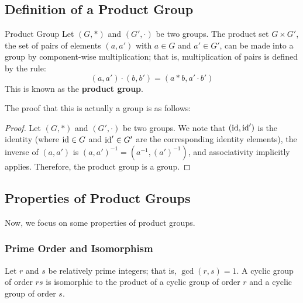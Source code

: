 \documentclass[letterpaper]{article}
\begin{document}
\subsection{Definition of a Product Group}
\begin{definition}{Product Group}{}
    Let $(G, *)$ and $(G', \cdot)$ be two groups. The product set $G \times G'$, the set of pairs of elements $(a, a')$ with $a \in G$ and $a' \in G'$, can be made into a group by component-wise multiplication; that is, multiplication of pairs is defined by the rule: 
    \[(a, a') \cdot (b, b') = (a * b, a' \cdot b')\]
    This is known as the \textbf{product group}.
\end{definition}
The proof that this is actually a group is as follows:
\begin{mdframed}
    \begin{proof}
        Let $(G, *)$ and $(G', \cdot)$ be two groups. We note that $(\operatorname{id}, \operatorname{id}')$ is the identity (where $\operatorname{id} \in G$ and $\operatorname{id}' \in G'$ are the corresponding identity elements), the inverse of $(a, a')$ is $(a, a')^{-1} = (a^{-1}, (a')^{-1})$, and associativity implicitly applies. Therefore, the product group is a group. 
    \end{proof}
\end{mdframed}

\subsection{Properties of Product Groups}
Now, we focus on some properties of product groups. 

\subsubsection{Prime Order and Isomorphism}
\begin{mdframed}
    \begin{proposition}
        Let $r$ and $s$ be relatively prime integers; that is, $\gcd(r, s) = 1$. A cyclic group of order $rs$ is isomorphic to the product of a cyclic group of order $r$ and a cyclic group of order $s$. 
    \end{proposition}
\end{mdframed}
\end{document}
